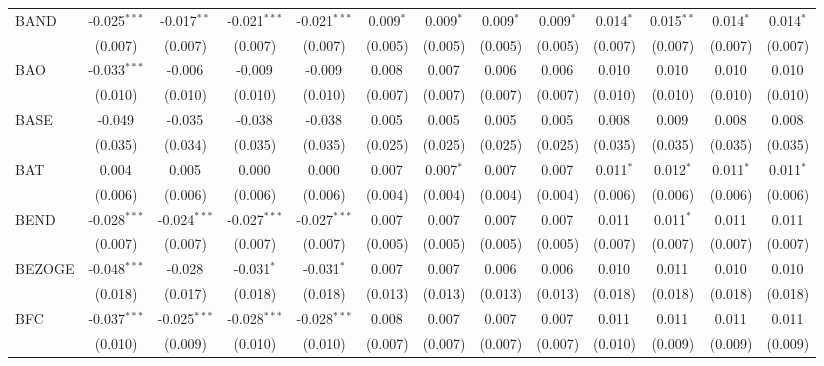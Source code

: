 \begin{table}[!htbp]
\begin{tabular}{@{\extracolsep{5pt}}lcccccccccccc}
 BAND & -0.025$^{***}$ & -0.017$^{**}$ & -0.021$^{***}$ & -0.021$^{***}$ & 0.009$^{*}$ & 0.009$^{*}$ & 0.009$^{*}$ & 0.009$^{*}$ & 0.014$^{*}$ & 0.015$^{**}$ & 0.014$^{*}$ & 0.014$^{*}$ \\
  & (0.007) & (0.007) & (0.007) & (0.007) & (0.005) & (0.005) & (0.005) & (0.005) & (0.007) & (0.007) & (0.007) & (0.007) \\
 BAO & -0.033$^{***}$ & -0.006$^{}$ & -0.009$^{}$ & -0.009$^{}$ & 0.008$^{}$ & 0.007$^{}$ & 0.006$^{}$ & 0.006$^{}$ & 0.010$^{}$ & 0.010$^{}$ & 0.010$^{}$ & 0.010$^{}$ \\
  & (0.010) & (0.010) & (0.010) & (0.010) & (0.007) & (0.007) & (0.007) & (0.007) & (0.010) & (0.010) & (0.010) & (0.010) \\
 BASE & -0.049$^{}$ & -0.035$^{}$ & -0.038$^{}$ & -0.038$^{}$ & 0.005$^{}$ & 0.005$^{}$ & 0.005$^{}$ & 0.005$^{}$ & 0.008$^{}$ & 0.009$^{}$ & 0.008$^{}$ & 0.008$^{}$ \\
  & (0.035) & (0.034) & (0.035) & (0.035) & (0.025) & (0.025) & (0.025) & (0.025) & (0.035) & (0.035) & (0.035) & (0.035) \\
 BAT & 0.004$^{}$ & 0.005$^{}$ & 0.000$^{}$ & 0.000$^{}$ & 0.007$^{}$ & 0.007$^{*}$ & 0.007$^{}$ & 0.007$^{}$ & 0.011$^{*}$ & 0.012$^{*}$ & 0.011$^{*}$ & 0.011$^{*}$ \\
  & (0.006) & (0.006) & (0.006) & (0.006) & (0.004) & (0.004) & (0.004) & (0.004) & (0.006) & (0.006) & (0.006) & (0.006) \\
 BEND & -0.028$^{***}$ & -0.024$^{***}$ & -0.027$^{***}$ & -0.027$^{***}$ & 0.007$^{}$ & 0.007$^{}$ & 0.007$^{}$ & 0.007$^{}$ & 0.011$^{}$ & 0.011$^{*}$ & 0.011$^{}$ & 0.011$^{}$ \\
  & (0.007) & (0.007) & (0.007) & (0.007) & (0.005) & (0.005) & (0.005) & (0.005) & (0.007) & (0.007) & (0.007) & (0.007) \\
 BEZOGE & -0.048$^{***}$ & -0.028$^{}$ & -0.031$^{*}$ & -0.031$^{*}$ & 0.007$^{}$ & 0.007$^{}$ & 0.006$^{}$ & 0.006$^{}$ & 0.010$^{}$ & 0.011$^{}$ & 0.010$^{}$ & 0.010$^{}$ \\
  & (0.018) & (0.017) & (0.018) & (0.018) & (0.013) & (0.013) & (0.013) & (0.013) & (0.018) & (0.018) & (0.018) & (0.018) \\
 BFC & -0.037$^{***}$ & -0.025$^{***}$ & -0.028$^{***}$ & -0.028$^{***}$ & 0.008$^{}$ & 0.007$^{}$ & 0.007$^{}$ & 0.007$^{}$ & 0.011$^{}$ & 0.011$^{}$ & 0.011$^{}$ & 0.011$^{}$ \\
  & (0.010) & (0.009) & (0.010) & (0.010) & (0.007) & (0.007) & (0.007) & (0.007) & (0.010) & (0.009) & (0.009) & (0.009) \\

\end{tabular}
\end{table}
